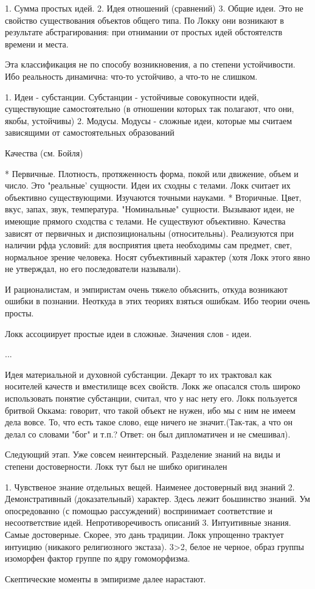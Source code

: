 	1. Сумма простых идей.
	2. Идея отношений (сравнений)
	3. Общие идеи. Это не свойство существования объектов общего типа. По Локку они возникают в результате абстрагирования: при отнимании от простых идей обстоятелств времени и места.

Эта классификация не по способу возникновения, а по степени устойчивости. Ибо реальность динамична: что-то устойчиво, а что-то не слишком.

	1. Идеи - субстанции. Субстанции - устойчивые совокупности идей, существующие самостоятельно (в отношении которых так полагают, что они, якобы, устойчивы)
	2. Модусы. Модусы - сложные идеи, которые мы считаем зависящими от самостоятельных образований

Качества (см. Бойля)

	* Первичные. Плотность, протяженность форма, покой или движение, объем и число. Это "реальные' сущности. Идеи их сходны с телами. Локк считает их объективно существующими. Изучаются точными науками.
	* Вторичные. Цвет, вкус, запах, звук, температура. "Номинальные" сущности. Вызывают идеи, не имеющие прямого сходства с телами. Не существуют объективно. Качества зависят от первичных и диспозициональны (относительны). Реализуются при наличии рфда условий: для восприятия цвета необходимы сам предмет, свет, нормальное зрение человека. Носят субъективный характер (хотя Локк этого явно не утверждал, но его последователи называли).

И рационалистам, и эмпиристам очень тяжело объяснить, откуда возникают ошибки в познании. Неоткуда в этих теориях взяться ошибкам. Ибо теории очень просты.

Локк ассоциирует простые идеи в сложные. Значения слов - идеи.

...

Идея материальной и духовной субстанции. Декарт то их трактовал как носителей качеств и вместилище всех свойств. Локк же опасался столь широко использовать понятие субстанции, считал, что у нас нету его. Локк пользуется бритвой Оккама: говорит, что такой объект не нужен, ибо мы с ним не имеем дела вовсе. То, что есть такое слово, еще ничего не значит.(Так-так, а что он делал со словами "бог" и т.п.? Ответ: он был дипломатичен и не смешивал).

Следующий этап. Уже совсем неинтерсный. Разделение знаний на виды и степени достоверности. Локк тут был не шибко оригинален

	1. Чувственое знание отдельных вещей.  Наименее достоверный вид знаний
	2. Демонстративный (доказательный) характер. Здесь лежит боьшинство знаний. Ум опосредованно (с помощью рассуждений) воспринимает соответствие и несоответствие идей. Непротиворечивость описаний
	3. Интуитивные знания. Самые достоверные. Скорее, это дань традиции. Локк упрощенно трактует интуицию (никакого религиозного экстаза). 3>2, белое не черное, образ группы изоморфен фактор группе по ядру гомоморфизма.

Скептические моменты в эмпиризме далее нарастают.
